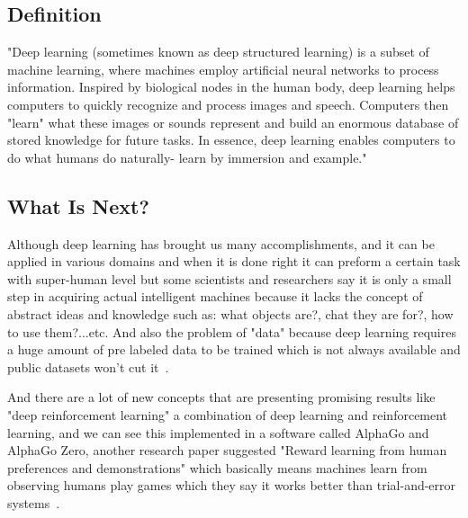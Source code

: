         \subsection{Definition}
            "Deep learning (sometimes known as deep structured learning) is a subset of machine learning, where machines employ artificial neural networks to process information. Inspired by biological nodes in the human body, deep learning helps computers to quickly recognize and process images and speech. Computers then "learn" what these images or sounds represent and build an enormous database of stored knowledge for future tasks. In essence, deep learning enables computers to do what humans do naturally- learn by immersion and example."~\cite{dl}
    
        \subsection{What Is Next?}
            Although deep learning has brought us many accomplishments, and it can be applied in various domains and when it is done right it can preform a certain task with super-human level but some scientists and researchers say it is only a small step in acquiring actual intelligent machines because it lacks the concept of abstract ideas and knowledge such as: what objects are?, chat they are for?, how to use them?...etc.
            And also the problem of "data" because deep learning requires a huge amount of pre labeled data to be trained which is not always available and public datasets won't cut it~\cite{dl}.
    
            And there are a lot of new concepts that are presenting promising results like "deep reinforcement learning" a combination of deep learning and reinforcement learning, and we can see this implemented in a software called AlphaGo and AlphaGo Zero, another research paper suggested  "Reward learning from human preferences and demonstrations" which basically means machines learn from observing humans play games which they say it works better than trial-and-error systems~\cite{dl}.
    
